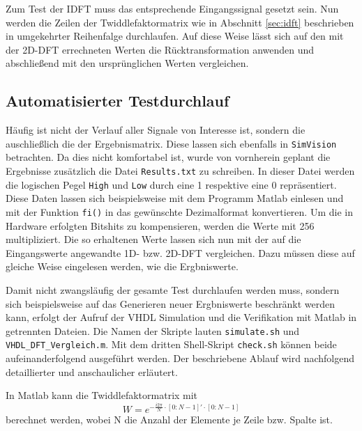 Zum Test der IDFT muss das entsprechende Eingangssignal gesetzt sein. Nun werden die Zeilen der Twiddlefaktormatrix wie in Abschnitt \ref{sec:idft} beschrieben 
in umgekehrter Reihenfalge durchlaufen. Auf diese Weise lässt sich auf den mit der 2D-DFT errechneten Werten die Rücktransformation anwenden und abschließend mit den
ursprünglichen Werten vergleichen.

\subsection{Automatisierter Testdurchlauf}\label{sec:automatisierterTestdurchlauf}
Häufig ist nicht der Verlauf aller Signale von Interesse ist, sondern die auschließlich die der Ergebnismatrix. Diese lassen sich ebenfalls in \texttt{SimVision} betrachten.
Da dies nicht komfortabel ist, wurde von vornherein geplant die Ergebnisse zusätzlich die Datei \texttt{Results.txt} zu schreiben.
In dieser Datei werden die logischen Pegel \texttt{High} und \texttt{Low} durch eine 1 respektive eine 0 repräsentiert. Diese Daten lassen sich beispielsweise mit
dem Programm Matlab einlesen und mit der Funktion \texttt{fi()} in das gewünschte Dezimalformat konvertieren. Um die in Hardware erfolgten Bitshits zu kompensieren,
werden die Werte mit 256 multipliziert. Die so erhaltenen Werte lassen sich nun mit der auf die Eingangswerte angewandte 1D- bzw. 2D-DFT vergleichen. Dazu müssen
diese auf gleiche Weise eingelesen werden, wie die Ergbniswerte.

Damit nicht zwangsläufig der gesamte Test durchlaufen werden muss, sondern sich beispielsweise auf das Generieren neuer Ergbniswerte beschränkt werden kann,
erfolgt der Aufruf der VHDL Simulation und die Verifikation mit Matlab in getrennten Dateien. Die Namen der Skripte lauten \texttt{simulate.sh} und \texttt{VHDL\_DFT\_Vergleich.m}. 
Mit dem dritten Shell-Skript \texttt{check.sh} können beide aufeinanderfolgend ausgeführt werden. Der beschriebene Ablauf wird nachfolgend detaillierter und anschaulicher erläutert.

In Matlab kann die Twiddlefaktormatrix mit
\[ W = e^{-\frac{i 2 \pi}{N}\cdot[0:N-1]'\cdot[0:N-1]} \]
berechnet werden, wobei N die Anzahl der Elemente je Zeile bzw. Spalte ist. 

